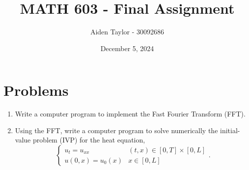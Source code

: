 \documentclass[11pt]{article}
\title{MATH 603 - Final Assignment}
\author{Aiden Taylor - 30092686}
\date{December 5, 2024}
\begin{document}
\maketitle
{}
\newpage
\tableofcontents
\newpage
\section{Problems}
	\begin{enumerate}[1.]
		\item Write a computer program to implement the Fast Fourier Transform (FFT).
	\item Using the FFT, write a computer program to solve numerically
		the initial-value problem (IVP) for the heat equation,
			\begin{equation*}
		\begin{cases}
			u_t = u_{xx} & (t,x) \in [0,T] \times [0,L] \\
			u(0,x) = u_0(x) & x \in [0,L]
		\end{cases}.
			\end{equation*}
	\end{enumerate}
\newpage
\end{document}

